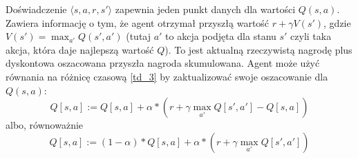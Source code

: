 \documentclass[a4paper, 12pt,oneside]{book}
\begin{document}
Doświadczenie $\langle s,a,r,s' \rangle$ zapewnia jeden punkt danych dla
wartości $Q(s,a)$. Zawiera informację o tym, że agent otrzymał przyszłą wartość
$r + \gamma V(s')$, gdzie $V(s') = \max_{a'}Q(s',a')$ (tutaj $a'$ to akcja
podjęta dla stanu $s'$ czyli taka akcja, która daje najlepszą wartość $Q$).
To jest aktualną rzeczywistą nagrodę plus dyskontowa
oszacowana przyszła nagroda skumulowana. Agent może użyć równania na różnicę
czasową \ref{td_3} by zaktualizować swoje oszacowanie dla $Q(s,a)$:
\begin{equation}
Q[s,a] := Q[s,a] + \alpha * \left(r + \gamma \max_{a'} Q[s',a'] -
Q[s,a]\right)
\label{qvalue_1}
\end{equation}
albo, równoważnie
\begin{equation}
Q[s,a] := (1 - \alpha) * Q[s,a] + \alpha * \left(r + \gamma \max_{a'}
Q[s',a'] \right)
\label{qvalue_2}
\end{equation}
\end{document}
